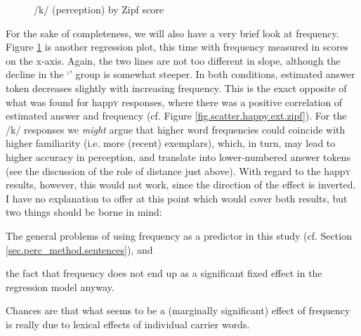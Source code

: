 \begin{figure}[h]
	\centering
		\resizebox{.49\linewidth}{!}{} 
	\caption{/k/ (perception) by Zipf score}
	\label{fig.scatter.k.ext.zipf}
\end{figure}

For the sake of completeness, we will also have a very brief look at frequency.
Figure \ref{fig.scatter.k.ext.zipf} is another regression plot, this time with frequency measured in  scores on the x-axis.
Again, the two lines are not too different in slope, although the decline in the `' group is somewhat steeper.
In both  conditions, estimated answer token decreases slightly with increasing frequency.
This is the exact opposite of what was found for happ\textsc{y} responses, where there was a positive correlation of estimated answer and frequency (cf. Figure \ref{fig.scatter.happy.ext.zipf}).
For the /k/ responses we \emph{might} argue that higher word frequencies could coincide with higher familiarity (i.e. more (recent) exemplars), which, in turn, may lead to higher accuracy in perception, and translate into lower-numbered answer tokens (see the discussion of the role of distance just above).
With regard to the happ\textsc{y} results, however, this would not work, since the direction of the effect is inverted.
I have no explanation to offer at this point which would cover both results, but two things should be borne in mind:
\begin{inparaenum}[(a)]
	\item The general problems of using frequency as a predictor in this study (cf. Section \ref{sec.perc_method.sentences}), and
	\item the fact that frequency does not end up as a significant fixed effect in the regression model anyway.
\end{inparaenum}
Chances are that what seems to be a (marginally significant) effect of frequency is really due to lexical effects of individual carrier words.